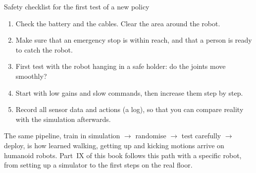 \begin{center}
\label{fig:rl6_pipeline}
\end{center}

\begin{stepbox}{Safety checklist for the first test of a new policy}
\begin{enumerate}[nosep]
  \item Check the battery and the cables. Clear the area around the robot.
  \item Make sure that an emergency stop is within reach, and that a person is ready to catch the robot.
  \item First test with the robot hanging in a safe holder: do the joints move smoothly?
  \item Start with low gains and slow commands, then increase them step by step.
  \item Record all sensor data and actions (a log), so that you can compare reality with the simulation afterwards.
\end{enumerate}
\end{stepbox}

\begin{aibox}
The same pipeline, train in simulation $\to$ randomise $\to$ test carefully $\to$ deploy, is how learned walking, getting up and kicking motions arrive on humanoid robots. Part~IX of this book follows this path with a specific robot, from setting up a simulator to the first steps on the real floor.
\end{aibox}


